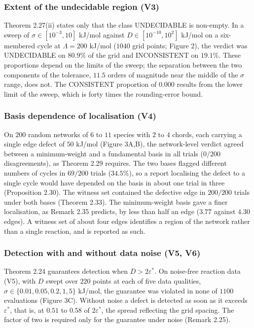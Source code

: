 \documentclass[11pt,a4paper]{article}
\theoremstyle{pstyle}
\theoremstyle{definition}
\theoremstyle{remark}
\newcommand{\eps}{\varepsilon}
\newcommand{\epsstar}{\eps^{\ast}}
\begin{document}
\subsubsection{Extent of the undecidable region (V3)}

Theorem 2.27(ii) states only that the class
\textsf{UNDECIDABLE} is non-empty. In a sweep of
$\sigma\in[10^{-3},10]$ kJ/mol against $D\in[10^{-10},10^{2}]$ kJ/mol
on a six-membered cycle at $\Lambda=200$ kJ/mol ($1040$ grid points;
Figure 2), the verdict was \textsf{UNDECIDABLE} on $80.9\%$
of the grid and \textsf{INCONSISTENT} on $19.1\%$. These proportions
depend on the limits of the sweep; the separation between the two
components of the tolerance, $11.5$ orders of magnitude near the middle
of the $\sigma$ range, does not. The \textsf{CONSISTENT} proportion of
$0.000$ results from the lower limit of the sweep, which is forty times
the rounding-error bound.

\subsubsection{Basis dependence of localisation (V4)}

On $200$ random networks of $6$ to $11$ species with $2$ to $4$ chords,
each carrying a single edge defect of $50$ kJ/mol
(Figure 3A,B), the network-level verdict agreed between a
minimum-weight and a fundamental basis in all trials ($0/200$
disagreements), as Theorem 2.29 requires. The two bases
flagged different numbers of cycles in $69/200$ trials ($34.5\%$), so a
report localising the defect to a single cycle would have depended on
the basis in about one trial in three
(Proposition 2.30). The witness set contained the
defective edge in $200/200$ trials under both bases
(Theorem 2.33). The minimum-weight basis gave a finer
localisation, as Remark 2.35 predicts, by less than half an edge
($3.77$ against $4.30$ edges). A witness set of about four edges
identifies a region of the network rather than a single reaction, and
is reported as such.

\subsubsection{Detection with and without data noise (V5, V6)}

Theorem 2.24 guarantees detection when $D>2\epsstar$. On
noise-free reaction data (V5), with $D$ swept over $220$ points at each
of five data qualities, $\sigma\in\{0.01,0.05,0.2,1,5\}$ kJ/mol, the
guarantee was violated in none of $1100$ evaluations
(Figure 3C). Without noise a defect is detected as soon as
it exceeds $\epsstar$, that is, at $0.51$ to $0.58$ of $2\epsstar$, the
spread reflecting the grid spacing. The factor of two is required only
for the guarantee under noise (Remark 2.25).
\end{document}
